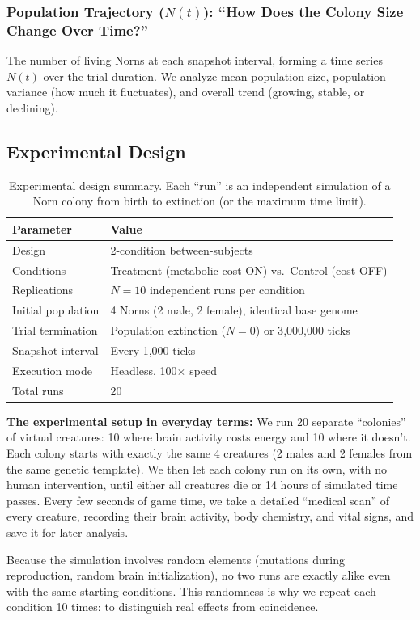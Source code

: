 \documentclass[12pt, a4paper]{article}
\begin{document}
\subsubsection{Population Trajectory ($N(t)$): ``How Does the Colony Size Change Over Time?''}
The number of living Norns at each snapshot interval, forming a time series $N(t)$ over the trial duration. We analyze mean population size, population variance (how much it fluctuates), and overall trend (growing, stable, or declining).

\subsection{Experimental Design}
\label{sec:design}

\begin{table}[H]
\centering
\caption{Experimental design summary. Each ``run'' is an independent simulation of a Norn colony from birth to extinction (or the maximum time limit).}
\label{tab:design}
\begin{tabular}{@{}ll@{}}
\toprule
\textbf{Parameter} & \textbf{Value} \\
\midrule
Design             & 2-condition between-subjects \\
Conditions         & Treatment (metabolic cost ON) vs.\ Control (cost OFF) \\
Replications       & $N = 10$ independent runs per condition \\
Initial population & 4 Norns (2 male, 2 female), identical base genome \\
Trial termination  & Population extinction ($N = 0$) or 3{,}000{,}000 ticks \\
Snapshot interval  & Every 1{,}000 ticks \\
Execution mode     & Headless, 100$\times$ speed \\
Total runs         & 20 \\
\bottomrule
\end{tabular}
\end{table}

\begin{plainbox}
\textbf{The experimental setup in everyday terms:} We run 20 separate ``colonies'' of virtual creatures: 10 where brain activity costs energy and 10 where it doesn't. Each colony starts with exactly the same 4 creatures (2 males and 2 females from the same genetic template). We then let each colony run on its own, with no human intervention, until either all creatures die or 14 hours of simulated time passes. Every few seconds of game time, we take a detailed ``medical scan'' of every creature, recording their brain activity, body chemistry, and vital signs, and save it for later analysis.

\medskip
Because the simulation involves random elements (mutations during reproduction, random brain initialization), no two runs are exactly alike even with the same starting conditions. This randomness is why we repeat each condition 10 times: to distinguish real effects from coincidence.
\end{plainbox}
\end{document}
